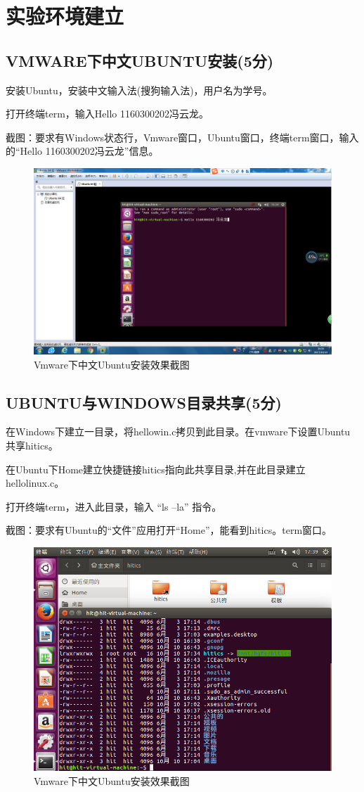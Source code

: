 \section{实验环境建立}
\subsection{VMWARE下中文UBUNTU安装(5分)}
安装Ubuntu，安装中文输入法(搜狗输入法)，用户名为学号。

打开终端term，输入Hello 1160300202冯云龙。

截图：要求有Windows状态行，Vmware窗口，Ubuntu窗口，终端term窗口，输入的“Hello 1160300202冯云龙”信息。

\begin{figure}[H]
	\centering
	\includegraphics[width=0.55\linewidth]{figures/VM-Ubuntu}
	\caption{Vmware下中文Ubuntu安装效果截图}
	\label{fig:vm-ubuntu}
\end{figure}

\subsection{UBUNTU与WINDOWS目录共享(5分)} 

在Windows下建立一目录，将hellowin.c拷贝到此目录。在vmware下设置Ubuntu共享hitics。

在Ubuntu下Home建立快捷链接hitics指向此共享目录,并在此目录建立hellolinux.c。

打开终端term，进入此目录，输入 “ls –la” 指令。

截图：要求有Ubuntu的“文件”应用打开“Home”，能看到hitics。term窗口。


\begin{figure}[H]
	\centering
	\includegraphics[width=0.5\linewidth]{figures/VM-Win-Lin-Share}
	\caption{Vmware下中文Ubuntu安装效果截图}
	\label{Ubuntu与Windows共享目录截图}
\end{figure}

